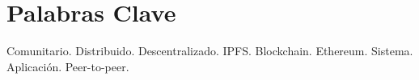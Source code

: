 \section{Palabras Clave}

Comunitario. Distribuido. Descentralizado. IPFS. Blockchain. Ethereum. Sistema. Aplicación. Peer-to-peer.